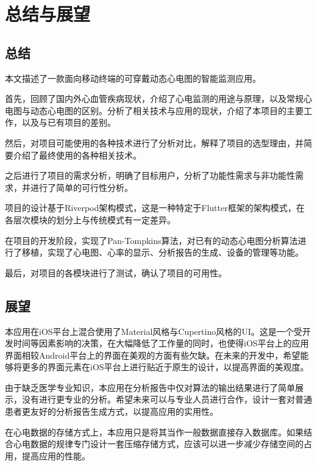 \chapter{总结与展望}\label{ch:conc}


\section{总结}\label{sec:conc}

本文描述了一款面向移动终端的可穿戴动态心电图的智能监测应用。

首先，回顾了国内外心血管疾病现状，介绍了心电监测的用途与原理，以及常规心电图与动态心电图的区别。分析了相关技术与应用的现状，介绍了本项目的主要工作，以及与已有项目的差别。

然后，对项目可能使用的各种技术进行了分析对比，解释了项目的选型理由，并简要介绍了最终使用的各种相关技术。

之后进行了项目的需求分析，明确了目标用户，分析了功能性需求与非功能性需求，并进行了简单的可行性分析。

项目的设计基于Riverpod架构模式，这是一种特定于Flutter框架的架构模式，在各层次模块的划分上与传统模式有一定差异。

在项目的开发阶段，实现了Pan-Tompkins算法，对已有的动态心电图分析算法进行了移植，实现了心电图、心率的显示、分析报告的生成、设备的管理等功能。

最后，对项目的各模块进行了测试，确认了项目的可用性。


\section{展望}\label{sec:pros}

本应用在iOS平台上混合使用了Material风格与Cupertino风格的UI。这是一个受开发时间等因素影响的决策，在大幅降低了工作量的同时，也使得iOS平台上的应用界面相较Android平台上的界面在美观的方面有些欠缺。在未来的开发中，希望能够将更多的界面元素在iOS平台上进行贴近于原生的设计，以提高界面的美观度。

由于缺乏医学专业知识，本应用在分析报告中仅对算法的输出结果进行了简单展示，没有进行更专业的分析。希望未来可以与专业人员进行合作，设计一套对普通患者更友好的分析报告生成方式，以提高应用的实用性。

在心电数据的存储方式上，本应用只是将其当作一般数据直接存入数据库。如果结合心电数据的规律专门设计一套压缩存储方式，应该可以进一步减少存储空间的占用，提高应用的性能。
